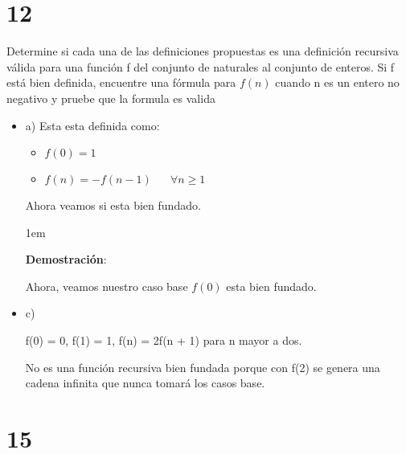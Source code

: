 \documentclass[12pt, fleqn]{article}                            %
\newenvironment{SmallIndentation}[1][0.75em]                    %
        {\begin{adjustwidth}{#1}{}\begin{footnotesize}}             %
        {\end{footnotesize}\end{adjustwidth}}                       %
\DeclareMathOperator \Space     {\quad}                         %
\theoremstyle{break}                                            %
\begin{document}
\clearpage
\section{12}

    Determine si cada una de las definiciones propuestas es una definición recursiva válida
    para una función f del conjunto de naturales al conjunto de enteros. Si f está bien definida,
    encuentre una fórmula para $f(n)$ cuando n es un entero no negativo y pruebe que la formula
    es valida

    \begin{itemize}
        
        \item a)
            Esta esta definida como:
            \begin{itemize}
                \item $f(0) = 1$
                \item $f(n) = -f(n - 1) \Space \forall n \geq 1$
            \end{itemize}

            Ahora veamos si esta bien fundado.
            \begin{SmallIndentation}[1em]
                \textbf{Demostración}:
            
                Ahora, veamos nuestro caso base $f(0)$ esta bien fundado.
            
            \end{SmallIndentation}

        \item c)

            f(0) = 0, f(1) = 1, f(n) = 2f(n + 1) para n mayor a dos.

            No es una función recursiva bien fundada porque con f(2) se genera una
            cadena infinita que nunca tomará los casos base.

    \end{itemize}


\section{15}
\end{document}
